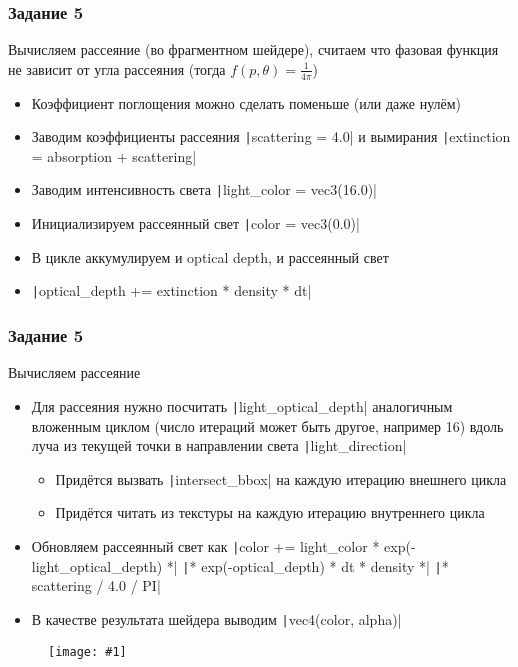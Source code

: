 \documentclass[10pt]{beamer}
\newcommand{\slideimage}[1]{
  \begin{figure}
    \begin{adjustbox}{width=\textwidth, totalheight=\textheight-2\baselineskip-2\baselineskip,keepaspectratio}
      \texttt{[image: \#1]}
    \end{adjustbox}
  \end{figure}
}
\begin{document}
\begin{frame}[fragile]
\frametitle{Задание 5}
Вычисляем рассеяние (во фрагментном шейдере), считаем что фазовая функция не зависит от угла рассеяния (тогда \begin{math}f(p,\theta) = \frac{1}{4\pi}\end{math})
\begin{itemize}
\item Коэффициент поглощения можно сделать поменьше (или даже нулём)
\item Заводим коэффициенты рассеяния \texttt|scattering = 4.0| и вымирания \texttt|extinction = absorption + scattering|
\item Заводим интенсивность света \texttt|light_color = vec3(16.0)|
\item Инициализируем рассеянный свет \texttt|color = vec3(0.0)|
\item В цикле аккумулируем и optical depth, и рассеянный свет
\item \texttt|optical_depth += extinction * density * dt|
\end{itemize}
\end{frame}

\begin{frame}[fragile]
\frametitle{Задание 5}
Вычисляем рассеяние
\begin{itemize}
\item Для рассеяния нужно посчитать \texttt|light_optical_depth| аналогичным вложенным циклом (число итераций может быть другое, например 16) вдоль луча из текущей точки в направлении света \texttt|light_direction|
\begin{itemize}
\item Придётся вызвать \texttt|intersect_bbox| на каждую итерацию внешнего цикла
\item Придётся читать из текстуры на каждую итерацию внутреннего цикла
\end{itemize}
\item Обновляем рассеянный свет как \texttt|color += light_color * exp(-light_optical_depth) *|
\texttt|* exp(-optical_depth) * dt * density *|
\texttt|* scattering / 4.0 / PI|
\item В качестве результата шейдера выводим \texttt|vec4(color, alpha)|
\end{itemize}
\end{frame}

\begin{frame}[fragile]
\slideimage{5.png}
\end{frame}
\end{document}
